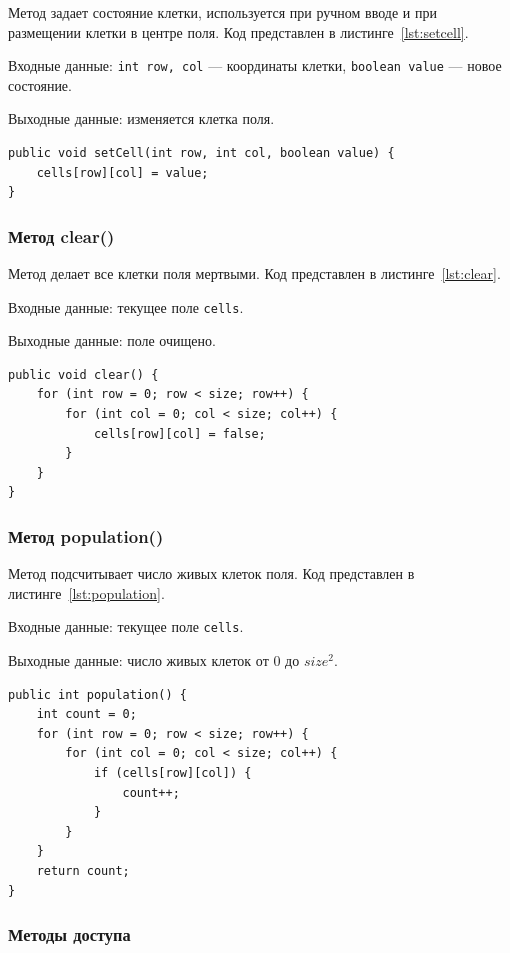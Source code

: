 \documentclass[a4paper,14pt]{extarticle}
\begin{document}
Метод задает состояние клетки, используется при ручном вводе и при размещении клетки в центре поля. Код представлен в листинге~\ref{lst:setcell}.

Входные данные: \texttt{int row, col} --- координаты клетки, \texttt{boolean value} --- новое состояние.

Выходные данные: изменяется клетка поля.

\begin{lstlisting}[caption={Метод setCell()}, label={lst:setcell}]
public void setCell(int row, int col, boolean value) {
	cells[row][col] = value;
}
\end{lstlisting}

\subsubsection*{Метод clear()}

Метод делает все клетки поля мертвыми. Код представлен в листинге~\ref{lst:clear}.

Входные данные: текущее поле \texttt{cells}.

Выходные данные: поле очищено.

\begin{lstlisting}[caption={Метод clear()}, label={lst:clear}]
public void clear() {
	for (int row = 0; row < size; row++) {
		for (int col = 0; col < size; col++) {
			cells[row][col] = false;
		}
	}
}
\end{lstlisting}

\subsubsection*{Метод population()}

Метод подсчитывает число живых клеток поля. Код представлен в листинге~\ref{lst:population}.

Входные данные: текущее поле \texttt{cells}.

Выходные данные: число живых клеток от 0 до $size^2$.

\begin{lstlisting}[caption={Метод population()}, label={lst:population}]
public int population() {
	int count = 0;
	for (int row = 0; row < size; row++) {
		for (int col = 0; col < size; col++) {
			if (cells[row][col]) {
				count++;
			}
		}
	}
	return count;
}
\end{lstlisting}

\subsubsection*{Методы доступа}
\end{document}
